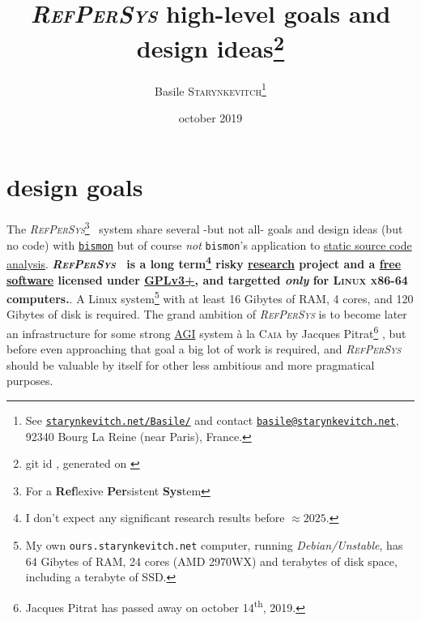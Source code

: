 \documentclass[11pt,a4paper,svgnames]{article}
\date{october 2019}
\newcommand{\mygitid}{\luadirect{tex.print(gitid)}}
\newcommand{\mydate}{\luadirect{tex.print(docdate)}}
\newcommand{\RefPerSys}{{\textit{\textsc{RefPerSys}}}}
\begin{document}
\title {\textit{\textsc{RefPerSys}} high-level goals and design
  ideas\thanks{git id \texttt{\mygitid}, generated on \textit{\mydate}}}
\author {Basile
  \textsc{Starynkevitch}\thanks{See \href{http://starynkevitch.net/Basile/}{\texttt{starynkevitch.net/Basile/}}
    and contact
    \href{mailto:basile@starynkevitch.net}{\texttt{basile@starynkevitch.net}},
    92340 Bourg La Reine {(near Paris)}, France.}}

\begin{titlepage}
  \thispagestyle{empty}
  \maketitle

  \bigskip


  \tableofcontents
  
\end{titlepage}



\section{design goals}

The \RefPerSys\footnote{For a \textbf{Ref}lexive \textbf{Per}sistent
\textbf{Sys}tem}~ system share several -but not all- goals and design
ideas (but no code) with
\href{http://github.com/bstarynk/bismon}{\texttt{bismon}}
\cite{Starynkevitch:2019:bismon-draft} but of course \emph{not}
\texttt{bismon}'s application to
\href{https://en.wikipedia.org/wiki/Static_program_analysis}{static
  source code analysis}. \textbf{\RefPerSys~ is a long term\footnote{I
  don't expect any significant research results before $\approx
  2025$.}  risky
  \href{https://en.wikipedia.org/wiki/Research}{research} project and
  a \href{https://www.gnu.org/philosophy/free-sw.en.html}{free
    software} licensed under
  \href{https://www.gnu.org/licenses/gpl-3.0.html}{GPLv3+}, and
  targetted \emph{only} for \textsc{Linux x86-64} computers.}. A Linux
system\footnote{My own \texttt{ours.starynkevitch.net} computer,
running \textit{Debian/Unstable}, has 64 Gibytes of RAM, 24 cores (AMD
2970WX) and terabytes of disk space, including a terabyte of SSD.}
with at least 16 Gibytes of RAM, 4 cores, and 120 Gibytes of disk is
required. The grand ambition of {\RefPerSys} is to become later an
infrastructure for some strong
\href{https://en.wikipedia.org/wiki/Artificial_general_intelligence}{AGI}
system à la \textsc{Caia} by Jacques Pitrat\footnote{Jacques Pitrat
has passed away on october 14\textsuperscript{th}, 2019.}
\cite{Pitrat:1996:FGCS, Pitrat:2009:AST, Pitrat:2009:ArtifBeings}, but
before even approaching that goal a big lot of work is required, and
{\RefPerSys} should be valuable by itself for other less ambitious and
more pragmatical purposes.
\end{document}

